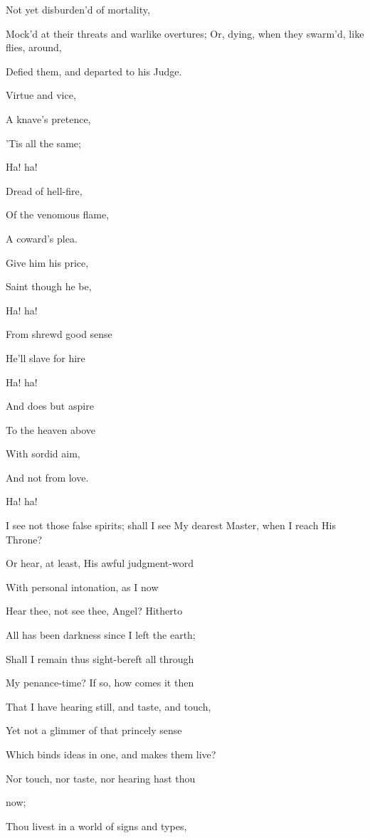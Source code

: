 Not yet disburden'd of mortality,

Mock'd at their threats and warlike overtures; Or, dying, when they swarm'd, like flies, around,

Defied them, and departed to his Judge.


Virtue and vice,

A knave's pretence,

'Tis all the same;

Ha! ha!

Dread of hell-fire,

Of the venomous flame,

A coward's plea.

Give him his price,

Saint though he be,

Ha! ha!

From shrewd good sense

He'll slave for hire

Ha! ha!

And does but aspire

To the heaven above

With sordid aim,

And not from love.

Ha! ha!


I see not those false spirits; shall I see My dearest Master, when I reach His Throne?

Or hear, at least, His awful judgment-word

With personal intonation, as I now

Hear thee, not see thee, Angel? Hitherto

All has been darkness since I left the earth;

Shall I remain thus sight-bereft all through

My penance-time? If so, how comes it then

That I have hearing still, and taste, and touch,

Yet not a glimmer of that princely sense

Which binds ideas in one, and makes them live?


Nor touch, nor taste, nor hearing hast thou

now;

Thou livest in a world of signs and types,

